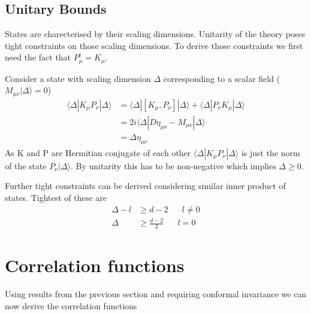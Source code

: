 \documentclass[12pt,a4paper,oneside]{book}
\theoremstyle{definition}
\begin{document}
    \subsection*{Unitary Bounds}\label{unitary}
        States are charecterised by their scaling dimensions. Unitarity of the theory poses tight constraints on those scaling dimensions. To derive those constraints we first need the fact that $P_{\mu}^{\dagger} = K_{\mu}$. \par
        Consider a state with scaling dimension $\Delta$ corresponding to a scalar field ($M_{\mu\nu}|\Delta\rangle = 0$)
        \begin{align}
            \langle\Delta|K_{\mu}P_{\nu}|\Delta \rangle &= \langle\Delta|[K_{\mu},P_{\nu}]|\Delta\rangle  + \langle\Delta|P_{\nu}K_{\mu}|\Delta\rangle\nonumber\\
            &= 2i\langle\Delta|D\eta_{\mu\nu}-M_{\mu\nu}|\Delta\rangle\\
            &= \Delta\eta_{\mu\nu}\nonumber
        \end{align}
        As K and P are Hermitian conjugate of each other $\langle\Delta|K_{\mu}P_{\nu}|\Delta \rangle$ is just the norm of the state $P_{\nu}|\Delta \rangle$. By unitarity this has to be non-negative which implies $\Delta\geq 0$.\par
        Further tight constraints can be derived considering similar inner product of states. Tightest of these are 
        \begin{subequations}
        \begin{align}
            \Delta -l &\geq d-2\hspace{20pt}l\neq 0\\
            \Delta &\geq \frac{d-2}{2}\hspace{20pt}l=0
        \end{align}
    \end{subequations}
    \section{Correlation functions}
    Using results from the previous section and requiring conformal invariance we can now derive the correlation functions 
\end{document}
